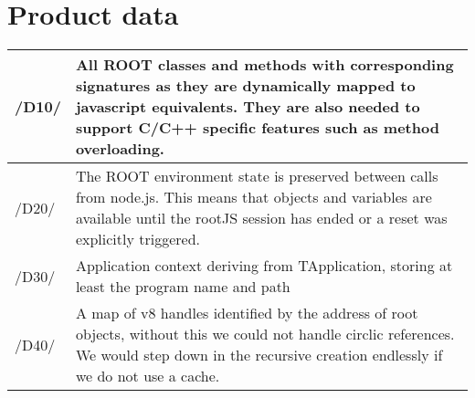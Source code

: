 \chapter{Product data}

\begin{longtable}{|p{1cm} | p{15cm}|}
\hline
/D10/ & All ROOT classes and methods with corresponding signatures as they are dynamically mapped to javascript equivalents. They are also needed to support C/C++ specific features such as method overloading.\\
\hline
/D20/ & The ROOT environment state is preserved between calls from node.js. This means that objects and variables are available until the rootJS session has ended or a reset was explicitly triggered.\\
\hline
/D30/ & Application context deriving from TApplication, storing at least the program name and path\\
\hline
/D40/ & A map of v8 handles identified by the address of root objects, without this we could not handle circlic references. We would step down in the recursive creation endlessly if we do not use a cache.\\
\hline
\end{longtable}